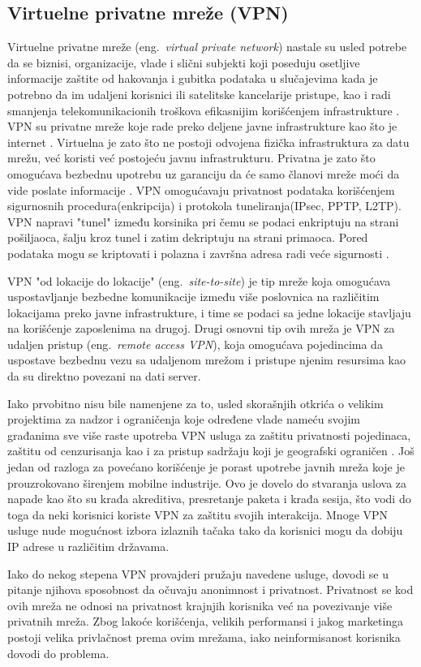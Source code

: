 \documentclass[a4paper]{article}
\begin{document}
\subsection{Virtuelne privatne mreže (VPN)}
Virtuelne privatne mreže (eng.~{\em virtual private network}) nastale su usled potrebe da se biznisi, organizacije, vlade i slični subjekti koji poseduju osetljive informacije zaštite od hakovanja i gubitka podataka u slučajevima kada je potrebno da im udaljeni korisnici ili satelitske kancelarije pristupe, kao i radi smanjenja telekomunikacionih troškova efikasnijim korišćenjem infrastrukture \cite{vpn1}. VPN su privatne mreže koje rade preko deljene javne infrastrukture kao što je internet \cite{vpn2}. Virtuelna je zato što ne postoji odvojena fizička infrastruktura za datu mrežu, već koristi već postojeću javnu infrastrukturu. Privatna je zato što  omogućava bezbednu upotrebu uz garanciju da će samo članovi mreže moći da vide poslate informacije \cite{vpn3}. VPN omogućavaju privatnost podataka korišćenjem sigurnosnih procedura(enkripcija)  i  protokola tuneliranja(IPsec, PPTP, L2TP). VPN napravi "tunel"  između korsinika pri čemu se podaci enkriptuju na strani pošiljaoca, šalju kroz tunel i zatim dekriptuju na strani primaoca. Pored podataka mogu se kriptovati i polazna i završna adresa radi veće sigurnosti \cite{vpn4}. 
\par VPN "od lokacije do lokacije" (eng.~{\em site-to-site}) je tip mreže koja omogućava uspostavljanje bezbedne komunikacije između više poslovnica na različitim lokacijama preko javne infrastrukture, i time se podaci sa jedne lokacije stavljaju na korišćenje zaposlenima na drugoj. Drugi osnovni tip ovih mreža je VPN za udaljen pristup (eng.~{\em remote access VPN}), koja omogućava pojedincima da uspostave bezbednu vezu sa udaljenom mrežom i pristupe njenim resursima kao da su direktno povezani na dati server.
\par Iako prvobitno nisu bile namenjene za to, usled skorašnjih otkrića o velikim projektima za nadzor i ograničenja koje određene vlade nameću svojim građanima sve više raste upotreba VPN usluga za zaštitu privatnosti pojedinaca, zaštitu od cenzurisanja kao i za pristup sadržaju koji je geografski ograničen \cite{vpn5}. Još jedan od razloga za povećano korišćenje je  porast upotrebe javnih mreža koje je prouzrokovano širenjem mobilne industrije. Ovo je dovelo do stvaranja uslova za napade kao što su krađa akreditiva, presretanje paketa i krađa sesija, što vodi do toga da neki korisnici koriste VPN za zaštitu svojih interakcija. Mnoge VPN usluge nude mogućnost izbora izlaznih tačaka tako da korisnici mogu da dobiju IP adrese u različitim državama.
\par Iako do nekog stepena VPN provajderi pružaju navedene usluge, dovodi se u pitanje njihova sposobnost da očuvaju anonimnost i privatnost. Privatnost se kod ovih mreža ne odnosi na privatnost krajnjih korisnika već na povezivanje više privatnih mreža. Zbog lakoće korišćenja, velikih performansi i jakog marketinga postoji velika privlačnost prema ovim mrežama, iako neinformisanost korisnika dovodi do problema.
\end{document}
